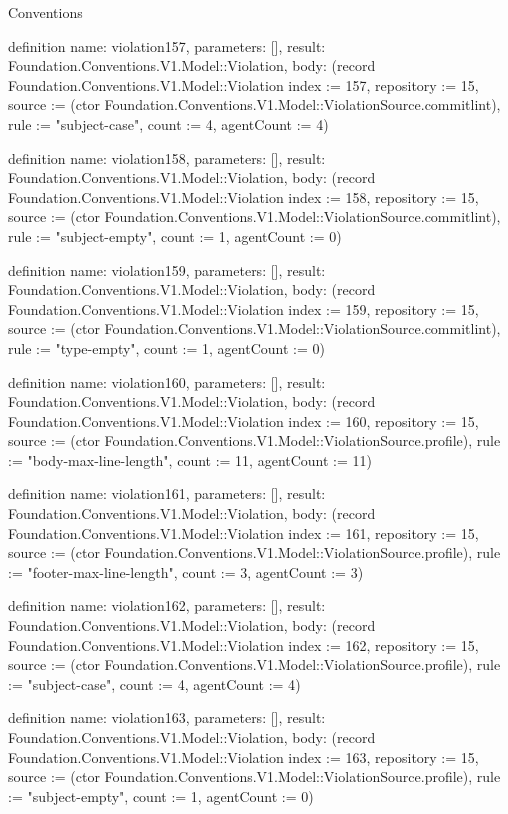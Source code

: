 \begin{lexlean}{Conventions}
\begin{semanticmodule}
definition{
  name: violation157,
  parameters: [],
  result: Foundation.Conventions.V1.Model::Violation,
  body: (record Foundation.Conventions.V1.Model::Violation {index := 157, repository := 15, source := (ctor Foundation.Conventions.V1.Model::ViolationSource.commitlint), rule := "subject-case", count := 4, agentCount := 4})
}

definition{
  name: violation158,
  parameters: [],
  result: Foundation.Conventions.V1.Model::Violation,
  body: (record Foundation.Conventions.V1.Model::Violation {index := 158, repository := 15, source := (ctor Foundation.Conventions.V1.Model::ViolationSource.commitlint), rule := "subject-empty", count := 1, agentCount := 0})
}

definition{
  name: violation159,
  parameters: [],
  result: Foundation.Conventions.V1.Model::Violation,
  body: (record Foundation.Conventions.V1.Model::Violation {index := 159, repository := 15, source := (ctor Foundation.Conventions.V1.Model::ViolationSource.commitlint), rule := "type-empty", count := 1, agentCount := 0})
}

definition{
  name: violation160,
  parameters: [],
  result: Foundation.Conventions.V1.Model::Violation,
  body: (record Foundation.Conventions.V1.Model::Violation {index := 160, repository := 15, source := (ctor Foundation.Conventions.V1.Model::ViolationSource.profile), rule := "body-max-line-length", count := 11, agentCount := 11})
}

definition{
  name: violation161,
  parameters: [],
  result: Foundation.Conventions.V1.Model::Violation,
  body: (record Foundation.Conventions.V1.Model::Violation {index := 161, repository := 15, source := (ctor Foundation.Conventions.V1.Model::ViolationSource.profile), rule := "footer-max-line-length", count := 3, agentCount := 3})
}

definition{
  name: violation162,
  parameters: [],
  result: Foundation.Conventions.V1.Model::Violation,
  body: (record Foundation.Conventions.V1.Model::Violation {index := 162, repository := 15, source := (ctor Foundation.Conventions.V1.Model::ViolationSource.profile), rule := "subject-case", count := 4, agentCount := 4})
}

definition{
  name: violation163,
  parameters: [],
  result: Foundation.Conventions.V1.Model::Violation,
  body: (record Foundation.Conventions.V1.Model::Violation {index := 163, repository := 15, source := (ctor Foundation.Conventions.V1.Model::ViolationSource.profile), rule := "subject-empty", count := 1, agentCount := 0})
}


\end{semanticmodule}
\end{lexlean}
